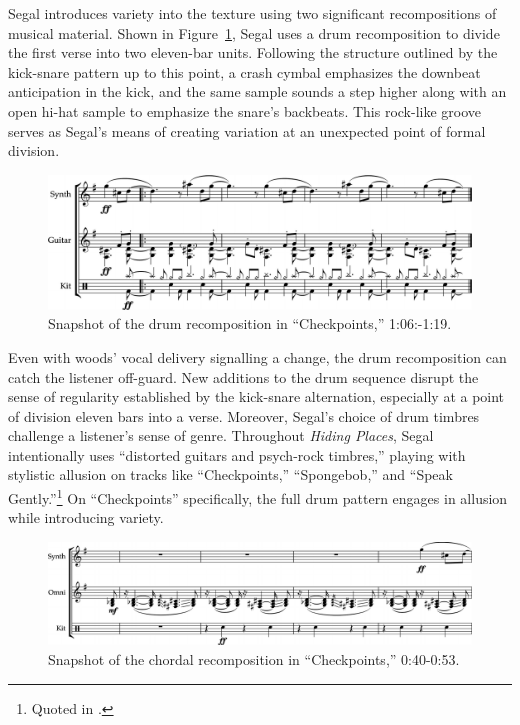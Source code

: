 Segal introduces variety into the texture using two significant recompositions of musical material. 
Shown in Figure~\ref{fig:checkpointsmain}, Segal uses a drum recomposition to divide the first verse 
into two eleven-bar units. Following the structure outlined by the kick-snare pattern up to this point,
a crash cymbal emphasizes the downbeat anticipation in the kick, and the same sample sounds a step 
higher along with an open hi-hat sample to emphasize the snare's backbeats. This rock-like groove 
serves as Segal's means of creating variation at an unexpected point of formal division.

    \begin{figure}[ht]
        \centering
        \includegraphics[width=\textwidth]{images/figures/chp 02/106119checkpointsmain.pdf}
        \caption{Snapshot of the drum recomposition in ``Checkpoints,'' 1:06:-1:19.}
        \label{fig:checkpointsmain}
    \end{figure}

Even with woods' vocal delivery signalling a change, the drum recomposition can catch the listener
off-guard. New additions to the drum sequence disrupt the sense of regularity established by the 
kick-snare alternation, especially at a point of division eleven bars into a verse. Moreover, Segal's
choice of drum timbres challenge a listener's sense of genre. Throughout \emph{Hiding Places}, Segal
intentionally uses ``distorted guitars and psych-rock timbres,'' playing with stylistic allusion on 
tracks like ``Checkpoints,'' ``Spongebob,'' and ``Speak Gently.''\footnote{Quoted in 
\cite{backwoodzhiphopKennySegalPresents2019}.} On ``Checkpoints'' specifically, the full drum pattern
engages in allusion while introducing variety.

    \begin{figure}[ht]
        \centering
        \includegraphics[width=\textwidth]{images/figures/chp 02/040053checkpointsrecomp.pdf}
        \caption{Snapshot of the chordal recomposition in ``Checkpoints,'' 0:40-0:53.}
        \label{fig:checkpointsrecomp}
    \end{figure}

